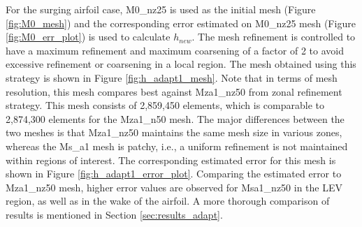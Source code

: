 For the surging airfoil case, M0\_nz25 is used as the initial mesh (Figure \ref{fig:M0_mesh}) and the corresponding error estimated on M0\_nz25 mesh (Figure \ref{fig:M0_err_plot}) is used to calculate $h_{new}$. The mesh refinement is controlled to have a maximum refinement and maximum coarsening of a factor of 2 to avoid excessive refinement or coarsening in a local region. The mesh obtained using this strategy is shown in Figure \ref{fig:h_adapt1_mesh}. Note that in terms of mesh resolution, this mesh compares best against Mza1\_nz50 from zonal refinement strategy. This mesh consists of 2,859,450 elements, which is comparable to 2,874,300 elements for the Mza1\_n50 mesh. The major differences between the two meshes is that Mza1\_nz50 maintains the same mesh size in various zones, whereas the Ms\_a1 mesh is patchy, i.e., a uniform refinement is not maintained within regions of interest.
The corresponding estimated error for this mesh is shown in Figure \ref{fig:h_adapt1_error_plot}. Comparing the estimated error to Mza1\_nz50 mesh, higher error values are observed for Msa1\_nz50 in the LEV region, as well as in the wake of the airfoil. A more thorough comparison of results is mentioned in Section \ref{sec:results_adapt}.
